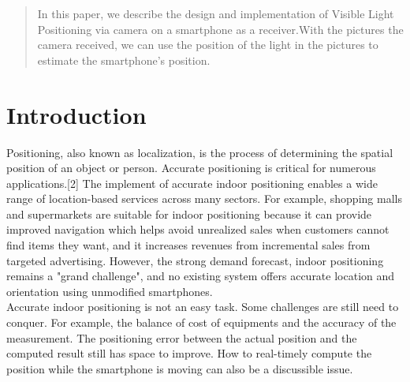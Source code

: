 \documentclass{sig-alternate}
\begin{document}
\maketitle
\begin{abstract}
In this paper, we describe the design and implementation of Visible Light Positioning via camera on a smartphone as a receiver.With the pictures the camera received, we can use the position of the light in the pictures to estimate the smartphone's position. 
\end{abstract}



\section{Introduction}
Positioning, also known as localization, is the process of determining the spatial position of an object or person. Accurate positioning is critical for numerous applications.{[2]} The implement of accurate indoor positioning enables a wide range of location-based services across many sectors. For example, shopping malls and supermarkets are suitable for indoor positioning because it can provide improved navigation which helps avoid unrealized sales when customers cannot find items they want, and it increases revenues from incremental sales from targeted advertising. However, the strong demand forecast, indoor positioning remains a "grand challenge", and no existing system offers accurate location and orientation using unmodified smartphones.\\
Accurate indoor positioning is not an easy task. Some challenges are still need to conquer. For example, the balance of cost of equipments and the accuracy of the measurement. The positioning error between the actual position and the computed result still has space to improve. How to real-timely compute the position while the smartphone is moving can also be a discussible issue.
\end{document}
